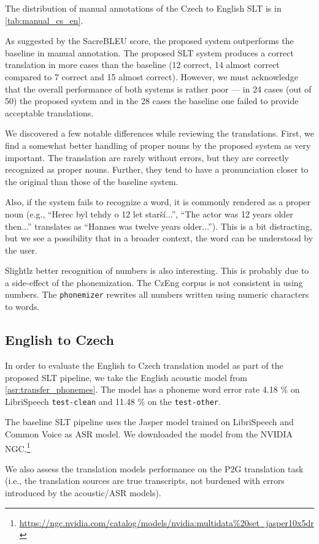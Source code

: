 The distribution of manual annotations of the Czech to English SLT is in \cref{tab:manual_cs_en}. 

As suggested by the SacreBLEU score, the proposed system outperforms the baseline in manual annotation. The proposed SLT system produces a correct translation in more cases than the baseline (12 correct, 14 almost correct compared to 7 correct and 15 almost correct). However, we must acknowledge that the overall performance of both systems is rather poor --- in 24 cases (out of 50) the proposed system and in the 28 cases the baseline one failed to provide acceptable translations.

We discovered a few notable differences while reviewing the translations. First, we find a somewhat better handling of proper nouns by the proposed system as very important. The translation are rarely without errors, but they are correctly recognized as proper nouns. Further, they tend to have a pronunciation closer to the original than those of the baseline system.

Also, if the system fails to recognize a word, it is commonly rendered as a proper noun (e.g., ``Herec byl tehdy o 12 let starší...'', ``The actor was 12 years older then...'' translates as ``Hannes was twelve years older...''). This is a bit distracting, but we see a possibility that in a broader context, the word can be understood by the user.

Slightlz better recognition of numbers is also interesting. This is probably due to a side-effect of the phonemization. The CzEng corpus is not consistent in using numbers. The \texttt{phonemizer} rewrites all numbers written using numeric characters to words.

\subsection{English to Czech}
In order to evaluate the English to Czech translation model as part of the proposed SLT pipeline, we take the English acoustic model from \cref{asr:transfer_phonemes}. The model has a phoneme word error rate 4.18 \% on LibriSpeech \texttt{test-clean} and 11.48 \% on the \texttt{test-other}.

The baseline SLT pipeline uses the Jasper model trained on LibriSpeech and Common Voice as ASR model. We downloaded the model from the NVIDIA NGC.\footnote{\url{https://ngc.nvidia.com/catalog/models/nvidia:multidata\%20set\_jasper10x5dr}}

We also assess the translation models performance on the P2G translation task (i.e., the translation sources are true transcripts, not burdened with errors introduced by the acoustic/ASR models).

